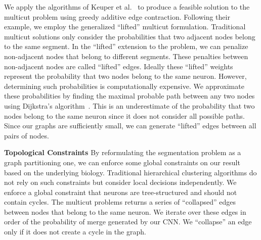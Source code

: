 We apply the algorithms of Keuper et al.~\cite{keuper2015efficient} to produce a feasible solution to the multicut problem using greedy additive edge contraction.
Following their example, we employ the generalized ``lifted'' multicut formulation.
Traditional multicut solutions only consider the probabilities that two adjacent nodes belong to the same segment. 
In the ``lifted'' extension to the problem, we can penalize non-adjacent nodes that belong to different segments. 
These penalties between non-adjacent nodes are called ``lifted'' edges. 
Ideally these ``lifted'' weights represent the probability that two nodes belong to the same neuron.
However, determining such probabilities is computationally expensive.
We approximate these probabilities by finding the maximal probable path between any two nodes using Dijkstra's algorithm~\cite{keuper2015efficient}.
This is an underestimate of the probability that two nodes belong to the same neuron since it does not consider all possible paths.
Since our graphs are sufficiently small, we can generate ``lifted'' edges between all pairs of nodes. 

\noindent\textbf{Topological Constraints}
By reformulating the segmentation problem as a graph partitioning one, we can enforce some global constraints on our result based on the underlying biology.
Traditional hierarchical clustering algorithms do not rely on such constraints but consider local decisions independently.
We enforce a global constraint that neurons are tree-structured and should not contain cycles. 
The multicut problems returns a series of ``collapsed'' edges between nodes that belong to the same neuron.
We iterate over these edges in order of the probability of merge generated by our CNN. 
We ``collapse'' an edge only if it does not create a cycle in the graph.
